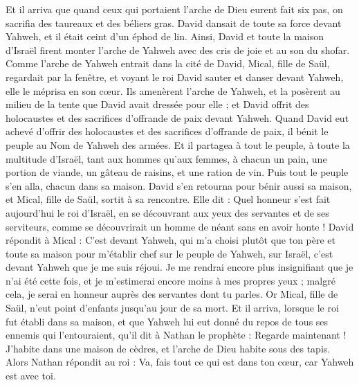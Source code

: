 \begin{multicols}{2}
Et il arriva que quand ceux qui portaient l'arche de Dieu eurent fait six pas, on sacrifia des taureaux et des béliers gras.
David dansait de toute sa force devant Yahweh, et il était ceint d'un éphod de lin.
Ainsi, David et toute la maison d'Israël firent monter l'arche de Yahweh avec des cris de joie et au son du shofar.
Comme l'arche de Yahweh entrait dans la cité de David, Mical, fille de Saül, regardait par la fenêtre, et voyant le roi David sauter et danser devant Yahweh, elle le méprisa en son cœur.
Ils amenèrent l'arche de Yahweh, et la posèrent au milieu de la tente que David avait dressée pour elle ; et David offrit des holocaustes et des sacrifices d’offrande de paix devant Yahweh.
Quand David eut achevé d'offrir des holocaustes et des sacrifices d'offrande de paix, il bénit le peuple au Nom de Yahweh des armées.
Et il partagea à tout le peuple, à toute la multitude d'Israël, tant aux hommes qu'aux femmes, à chacun un pain, une portion de viande, un gâteau de raisins, et une ration de vin. Puis tout le peuple s'en alla, chacun dans sa maison.
David s'en retourna pour bénir aussi sa maison, et Mical, fille de Saül, sortit à sa rencontre. Elle dit : Quel honneur s'est fait aujourd'hui le roi d'Israël, en se découvrant aux yeux des servantes et de ses serviteurs, comme se découvrirait un homme de néant sans en avoir honte !
David répondit à Mical : C’est devant Yahweh, qui m'a choisi plutôt que ton père et toute sa maison pour m’établir chef sur le peuple de Yahweh, sur Israël, c'est devant Yahweh que je me suis réjoui.
Je me rendrai encore plus insignifiant que je n’ai été cette fois, et je m’estimerai encore moins à mes propres yeux ; malgré cela, je serai en honneur auprès des servantes dont tu parles.
Or Mical, fille de Saül, n'eut point d’enfants jusqu'au jour de sa mort.
\VerseOne{}Et il arriva, lorsque le roi fut établi dans sa maison, et que Yahweh lui eut donné du repos de tous ses ennemis qui l’entouraient,
qu’il dit à Nathan le prophète : Regarde maintenant ! J'habite dans une maison de cèdres, et l'arche de Dieu habite sous des tapis.
Alors Nathan répondit au roi : Va, fais tout ce qui est dans ton cœur, car Yahweh est avec toi.

\end{multicols}
